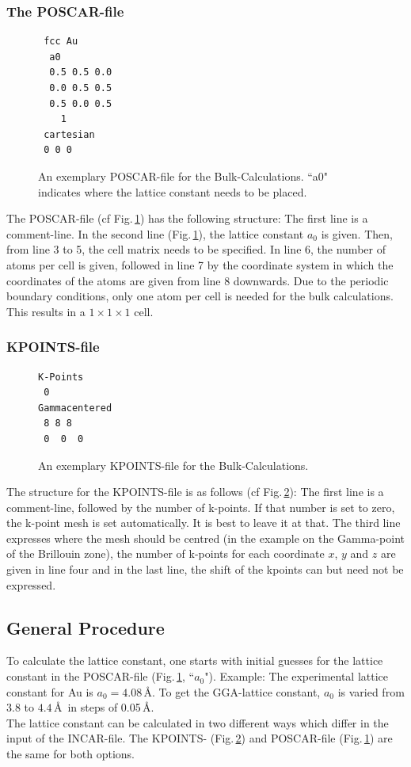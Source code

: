 \documentclass[twoside, 11pt, titlepage, captions=nooneline, a4paper, headsepline]{scrbook}%
\newcommand{\9}{\mathrm}
\newcommand{\0}{\,\mathrm}
\begin{document}
\subsubsection*{The POSCAR-file}
\begin{figure}[h!]
\begin{verbatim}
 fcc Au
  a0
  0.5 0.5 0.0
  0.0 0.5 0.5
  0.5 0.0 0.5
    1
 cartesian
 0 0 0
\end{verbatim}
\caption{An exemplary POSCAR-file for the Bulk-Calculations. ``a0" indicates where the lattice constant needs to be placed.}
\label{bposcar}
\end{figure}
The POSCAR-file (cf Fig.\,\ref{bposcar}) has the following structure: The first line is a comment-line. In the second line (Fig.\,\ref{bposcar}), the lattice constant $a_0$ is given. Then, from line 3 to 5, the cell matrix needs to be specified. In line 6, the number of atoms per cell is given, followed in line 7 by the coordinate system in which the coordinates of the atoms are given from line 8 downwards. Due to the periodic boundary conditions, only one atom per cell is needed for the bulk calculations. This results in a $1\times1\times1$ cell.
\subsubsection*{KPOINTS-file}
\begin{figure}[h!]
\begin{verbatim}
K-Points
 0
Gammacentered
 8 8 8
 0  0  0
\end{verbatim}
\caption{An exemplary KPOINTS-file for the Bulk-Calculations.}
\label{bkp}
\end{figure}
\noindent The structure for the KPOINTS-file is as follows (cf Fig.\,\ref{bkp}): The first line is a comment-line, followed by the number of k-points. If that number is set to zero, the k-point mesh is set automatically. It is best to leave it at that. The third line expresses where the mesh should be centred (in the example on the Gamma-point of the Brillouin zone), the number of k-points for each coordinate $x$, $y$ and $z$ are given in line four and in the last line, the shift of the kpoints can but need not be expressed.\\
\subsection{General Procedure}
To calculate the lattice constant, one starts with initial guesses for the lattice constant in the POSCAR-file (Fig.\,\ref{bposcar}, ``$a_0$"). Example: The experimental lattice constant for Au is $a_0=4.08$\,\AA. To get the GGA-lattice constant, $a_0$ is varied from $3.8$ to $4.4$\,\AA~in steps of 0.05\,\AA.\\
The lattice constant can be calculated in two different ways which differ in the input of the INCAR-file. The KPOINTS- (Fig.\,\ref{bkp}) and POSCAR-file (Fig.\,\ref{bposcar}) are the same for both options.
\end{document}
